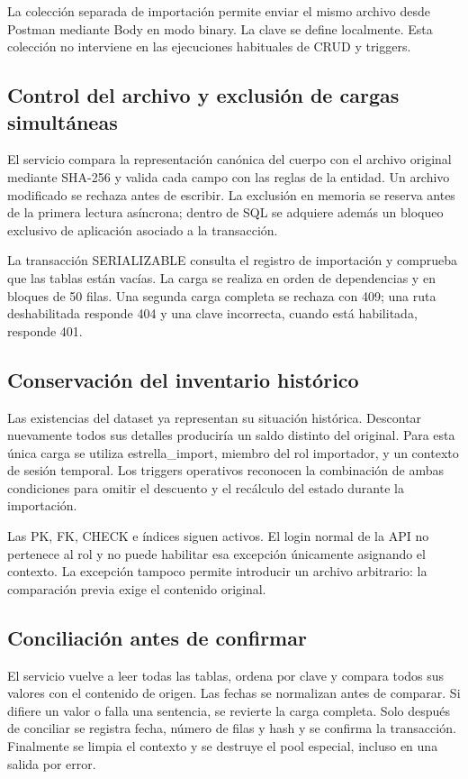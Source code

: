 La colección separada de importación permite enviar el mismo archivo desde Postman mediante Body en modo binary. La clave se define localmente. Esta colección no interviene en las ejecuciones habituales de CRUD y triggers.

\subsection{Control del archivo y exclusión de cargas simultáneas}
El servicio compara la representación canónica del cuerpo con el archivo original mediante SHA-256 y valida cada campo con las reglas de la entidad. Un archivo modificado se rechaza antes de escribir. La exclusión en memoria se reserva antes de la primera lectura asíncrona; dentro de SQL se adquiere además un bloqueo exclusivo de aplicación asociado a la transacción.

La transacción SERIALIZABLE consulta el registro de importación y comprueba que las tablas están vacías. La carga se realiza en orden de dependencias y en bloques de 50 filas. Una segunda carga completa se rechaza con 409; una ruta deshabilitada responde 404 y una clave incorrecta, cuando está habilitada, responde 401.

\subsection{Conservación del inventario histórico}
Las existencias del dataset ya representan su situación histórica. Descontar nuevamente todos sus detalles produciría un saldo distinto del original. Para esta única carga se utiliza estrella\_import, miembro del rol importador, y un contexto de sesión temporal. Los triggers operativos reconocen la combinación de ambas condiciones para omitir el descuento y el recálculo del estado durante la importación.

Las PK, FK, CHECK e índices siguen activos. El login normal de la API no pertenece al rol y no puede habilitar esa excepción únicamente asignando el contexto. La excepción tampoco permite introducir un archivo arbitrario: la comparación previa exige el contenido original.

\subsection{Conciliación antes de confirmar}
El servicio vuelve a leer todas las tablas, ordena por clave y compara todos sus valores con el contenido de origen. Las fechas se normalizan antes de comparar. Si difiere un valor o falla una sentencia, se revierte la carga completa. Solo después de conciliar se registra fecha, número de filas y hash y se confirma la transacción. Finalmente se limpia el contexto y se destruye el pool especial, incluso en una salida por error.

